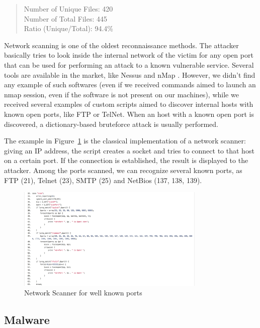 \begin{quote}
Number of Unique Files: 420\\
Number of Total Files: 445\\
Ratio (Unique/Total): 94.4\%
\end{quote}

Network scanning is one of the oldest reconnaissance methods. The attacker basically tries to look inside the internal network of the victim for any open port that can be used for performing an attack to a known vulnerable service. Several tools are available in the market, like Nessus \cite{nessus} and nMap \cite{nmap}. However, we didn't find any example of such softwares (even if we received commands aimed to launch an nmap session, even if the software is not present on our machines), while we received several examples of custom scripts aimed to discover internal hosts with known open ports, like FTP or TelNet. When an host with a known open port is discovered, a dictionary-based bruteforce attack is usually performed.

The example in Figure~\ref{fig:networkScanner} is the classical implementation of a network scanner: giving an IP address, the script creates a socket and tries to connect to that host on a certain port. If the connection is established, the result is displayed to the attacker. Among the ports scanned, we can recognize several known ports, as FTP (21), Telnet (23), SMTP (25) and NetBios (137, 138, 139).

\begin{figure}[H]
\centerline{\includegraphics[width=0.8\textwidth]{Images/networkScanner.jpg}}
\caption{Network Scanner for well known ports\label{fig:networkScanner}}
\end{figure}

\subsection{Malware}

